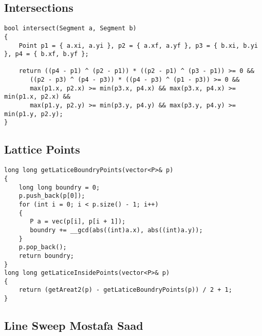 \subsection{Intersections}

\begin{lstlisting}[style=cpp]
bool intersect(Segment a, Segment b)  
{  
    Point p1 = { a.xi, a.yi }, p2 = { a.xf, a.yf }, p3 = { b.xi, b.yi }, p4 = { b.xf, b.yf };  
  
    return ((p4 - p1) ^ (p2 - p1)) * ((p2 - p1) ^ (p3 - p1)) >= 0 &&  
       ((p2 - p3) ^ (p4 - p3)) * ((p4 - p3) ^ (p1 - p3)) >= 0 &&  
       max(p1.x, p2.x) >= min(p3.x, p4.x) && max(p3.x, p4.x) >= min(p1.x, p2.x) &&  
       max(p1.y, p2.y) >= min(p3.y, p4.y) && max(p3.y, p4.y) >= min(p1.y, p2.y);  
}
\end{lstlisting}

\subsection{Lattice Points}

\begin{lstlisting}[style=cpp]
long long getLaticeBoundryPoints(vector<P>& p)  
{  
    long long boundry = 0;  
    p.push_back(p[0]);  
    for (int i = 0; i < p.size() - 1; i++)  
    {  
       P a = vec(p[i], p[i + 1]);  
       boundry += __gcd(abs((int)a.x), abs((int)a.y));  
    }  
    p.pop_back();  
    return boundry;  
}  
long long getLaticeInsidePoints(vector<P>& p)  
{  
    return (getAreat2(p) - getLaticeBoundryPoints(p)) / 2 + 1;  
}
\end{lstlisting}

\subsection{Line Sweep Mostafa Saad}

